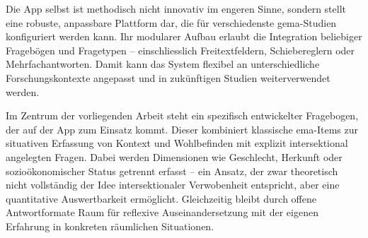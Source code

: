 Die App selbst ist methodisch nicht innovativ im engeren Sinne, sondern stellt eine robuste, anpassbare Plattform dar, die für verschiedenste \acrshort{gema}-Studien konfiguriert werden kann. Ihr modularer Aufbau erlaubt die Integration beliebiger Fragebögen und Fragetypen -- einschliesslich Freitextfeldern, Schiebereglern oder Mehrfachantworten. Damit kann das System flexibel an unterschiedliche Forschungskontexte angepasst und in zukünftigen Studien weiterverwendet werden.

Im Zentrum der vorliegenden Arbeit steht ein spezifisch entwickelter Fragebogen, der auf der App zum Einsatz kommt. Dieser kombiniert klassische \gls{ema}-Items zur situativen Erfassung von Kontext und Wohlbefinden mit explizit intersektional angelegten Fragen. Dabei werden Dimensionen wie Geschlecht, Herkunft oder sozioökonomischer Status getrennt erfasst -- ein Ansatz, der zwar theoretisch nicht vollständig der Idee intersektionaler Verwobenheit entspricht, aber eine quantitative Auswertbarkeit ermöglicht. Gleichzeitig bleibt durch offene Antwortformate Raum für reflexive Auseinandersetzung mit der eigenen Erfahrung in konkreten räumlichen Situationen.

